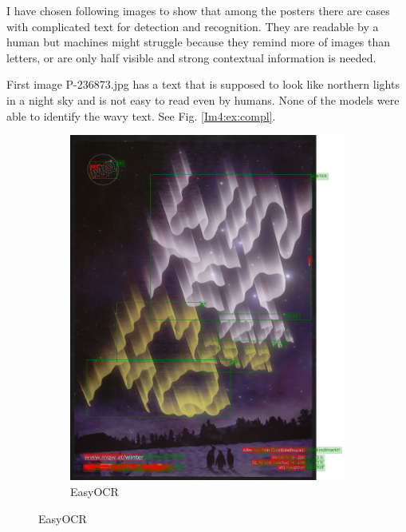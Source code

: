 
I have chosen following images to show that among the posters there are cases with complicated text for detection and recognition. They are readable by a human but machines might struggle because they remind more of images than letters, or are only half visible and strong contextual information is needed.

First image P-236873.jpg has a text that is supposed to look like northern lights in a night sky and is not easy to read even by humans. None of the models were able to identify the wavy text. See Fig. \ref*{Im4:ex:compl}.

\begin{figure}[hbtp!]
    \begin{subfigure}{0.5\textwidth}
        \includegraphics[scale=0.3]{obrazky/plakaty/result_easyOCR_vienna1_split_tuning_special_sensitive-73complecatedP-236873.png}
        \caption{EasyOCR}

\end{subfigure}
\end{figure}

